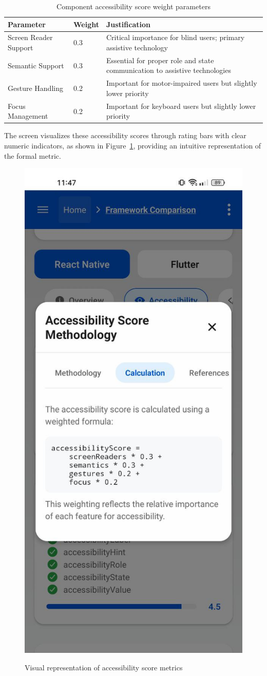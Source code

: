 \begin{table}[ht]
\caption{Component accessibility score weight parameters}
\label{tab:metric_weight_parameters}
\centering
\begin{tabular}{|C{3.5cm}|C{2.5cm}|C{7cm}|}
\hline
\textbf{Parameter} & \textbf{Weight} & \textbf{Justification} \\
\hline
Screen Reader Support & 0.3 & Critical importance for blind users; primary assistive technology \\
\hline
Semantic Support & 0.3 & Essential for proper role and state communication to assistive technologies \\
\hline
Gesture Handling & 0.2 & Important for motor-impaired users but slightly lower priority \\
\hline
Focus Management & 0.2 & Important for keyboard users but slightly lower priority \\
\hline
\end{tabular}
\end{table}

\FloatBarrier

The screen visualizes these accessibility scores through rating bars with clear numeric indicators, as shown in Figure~\ref{fig:accessibility_rating_bars}, providing an intuitive representation of the formal metric.

\begin{figure}[ht]
    \centering
    \includegraphics[width=0.3\linewidth, alt={Screen reader support comparison methodology}]{img/accessibility-calculation.jpg}
    \caption{Visual representation of accessibility score metrics}
    \label{fig:accessibility_rating_bars}
\end{figure}

